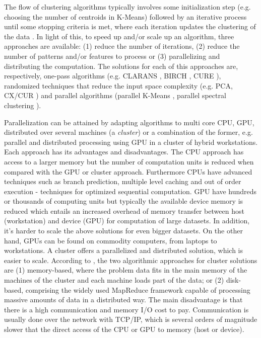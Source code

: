 The flow of clustering algorithms typically involves some initialization step (e.g. choosing the number of centroids in K-Means) followed by an iterative process until some stopping criteria is met, where each iteration updates the clustering of the data \cite{Aggarwal2014}.
In light of this, to speed up and/or scale up an algorithm, three approaches are available: (1) reduce the number of iterations, (2) reduce the number of patterns and/or features to process or (3) parallelizing and distributing the computation.
The solutions for each of this approaches are, respectively, one-pass algorithms (e.g. CLARANS \cite{ng2002clarans}, BIRCH \cite{zhang1996birch}, CURE \cite{guha1998cure}), randomized techniques that reduce the input space complexity (e.g. PCA, CX/CUR \cite{drineas2006fast}) and parallel algorithms (parallel K-Means \cite{Zechner2009b}, parallel spectral clustering \cite{chen2011parallel}).


Parallelization can be attained by adapting algorithms to multi core CPU, GPU, distributed over several machines (a \emph{cluster}) or a combination of the former, e.g. parallel and distributed processing using GPU in a cluster of hybrid workstations.
Each approach has its advantages and disadvantages.
The CPU approach has access to a larger memory but the number of computation units is reduced when compared with the GPU or cluster approach.
Furthermore CPUs have advanced techniques such as branch prediction, multiple level caching and out of order execution - techniques for optimized sequential computation.
GPU have hundreds or thousands of computing units but typically the available device memory is reduced which entails an increased overhead of memory transfer between host (workstation) and device (GPU) for computation of large datasets.
In addition, it's harder to scale the above solutions for even bigger datasets.
On the other hand, GPUs can be found on commodity computers, from laptops to workstations.
A cluster offers a parallelized and distributed solution, which is easier to scale.
According to \cite{Aggarwal2014}, the two algorithmic approaches for cluster solutions are (1) memory-based, where the problem data fits in the main memory of the machines of the cluster and each machine loads part of the data; or (2) disk-based, comprising the widely used MapReduce framework capable of processing massive amounts of data in a distributed way.
The main disadvantage is that there is a high communication and memory I/O cost to pay.
Communication is usually done over the network with TCP/IP, which is several orders of magnitude slower that the direct access of the CPU or GPU to memory (host or device).

